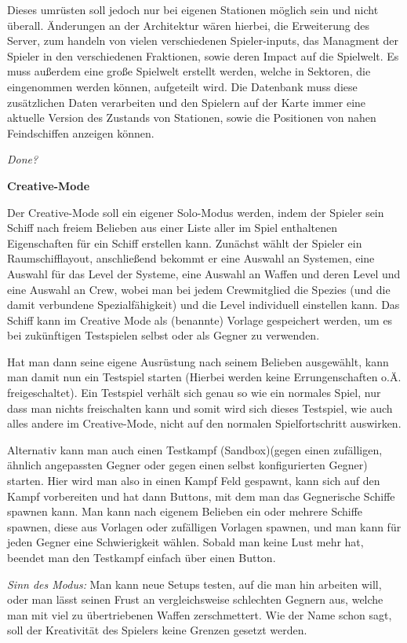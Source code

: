 \documentclass[fontsize=12pt,paper=a4,twoside]{scrartcl}
\begin{document}
Dieses umrüsten soll jedoch nur bei eigenen Stationen möglich sein und nicht überall. Änderungen an der Architektur wären hierbei, die Erweiterung des Server, zum handeln von vielen verschiedenen Spieler-inputs, das Managment der Spieler in den verschiedenen Fraktionen, sowie deren Impact auf die Spielwelt. Es muss außerdem eine große Spielwelt erstellt werden, welche in Sektoren, die eingenommen werden können, aufgeteilt wird. Die Datenbank muss diese zusätzlichen Daten verarbeiten und den Spielern auf der Karte immer eine aktuelle Version des Zustands von Stationen, sowie die Positionen von nahen Feindschiffen anzeigen können. 

\textit{Done?}




\textbf{Creative-Mode}
{
Der Creative-Mode soll ein eigener Solo-Modus werden, indem der Spieler sein Schiff nach freiem Belieben aus einer Liste aller im Spiel enthaltenen Eigenschaften für ein Schiff erstellen kann. Zunächst wählt der Spieler ein Raumschifflayout, anschließend bekommt er eine Auswahl an Systemen, eine Auswahl für das Level der Systeme, eine Auswahl an Waffen und deren Level und eine Auswahl an Crew, wobei man bei jedem Crewmitglied die Spezies (und die damit verbundene Spezialfähigkeit) und die Level individuell einstellen kann. 
Das Schiff kann im Creative Mode als (benannte) Vorlage gespeichert werden, um es bei zukünftigen Testspielen selbst oder als Gegner zu verwenden.

Hat man dann seine eigene Ausrüstung nach seinem Belieben ausgewählt, kann man damit nun ein Testspiel starten (Hierbei werden keine Errungenschaften o.Ä. freigeschaltet). Ein Testspiel verhält sich genau so wie ein normales Spiel, nur dass man nichts freischalten kann und somit wird sich dieses Testspiel, wie auch alles andere im Creative-Mode, nicht auf den normalen Spielfortschritt auswirken. 

Alternativ kann man auch einen Testkampf (Sandbox)(gegen einen zufälligen, ähnlich angepassten Gegner oder gegen einen selbst konfigurierten Gegner) starten. Hier wird man also in einen Kampf Feld gespawnt, kann sich auf den Kampf vorbereiten und hat dann Buttons, mit dem man das Gegnerische Schiffe spawnen kann. Man kann nach eigenem Belieben ein oder mehrere Schiffe spawnen, diese aus Vorlagen oder zufälligen Vorlagen spawnen, und man kann für jeden Gegner eine Schwierigkeit wählen. Sobald man keine Lust mehr hat, beendet man den Testkampf einfach über einen Button. 

\textit{Sinn des Modus:}
Man kann neue Setups testen, auf die man hin arbeiten will, oder man lässt seinen Frust an vergleichsweise schlechten Gegnern aus, welche man mit viel zu übertriebenen Waffen zerschmettert. Wie der Name schon sagt, soll der Kreativität des Spielers keine Grenzen gesetzt werden.

}
\end{document}
